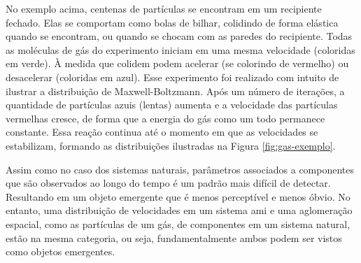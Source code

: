     \begin{figure}[h!]
        \centering
    \end{figure}
    
    
    No exemplo acima, centenas de partículas se encontram em um recipiente fechado. Elas se comportam como bolas de bilhar, colidindo de forma elástica quando se encontram, ou quando se chocam com as paredes do recipiente. Todas as moléculas de gás do experimento iniciam em uma mesma velocidade (coloridas em verde). À medida que colidem podem acelerar (se colorindo de vermelho) ou desacelerar (coloridas em azul). Esse experimento foi realizado com intuito de ilustrar a distribuição de Maxwell-Boltzmann.  Após um número de iterações, a quantidade de partículas azuis (lentas) aumenta e a velocidade das partículas vermelhas cresce, de forma que a energia do gás como um todo permanece constante. Essa reação continua até o momento em que as velocidades se estabilizam, formando as distribuições ilustradas na Figura \ref{fig:gas-exemplo}.

    Assim como no caso dos sistemas naturais, parâmetros associados a componentes que são observados ao longo do tempo é um padrão mais difícil de detectar. Resultando em um objeto emergente que é menos perceptível e menos óbvio. No entanto, uma distribuição de velocidades em um sistema \acrshort{ami} e uma aglomeração espacial, como as partículas de um gás, de componentes em um sistema natural, estão na mesma categoria, ou seja, fundamentalmente ambos podem ser vistos como objetos emergentes.
    
    
